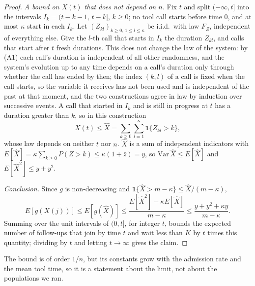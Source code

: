 \begin{proof}
\emph{A bound on $X(t)$ that does not depend on $n$.} Fix $t$ and split $(-\infty,t]$ into the intervals $I_k=(t-k-1,\,t-k]$, $k\ge0$; no tool call starts before time 0, and at most $\kappa$ start in each $I_k$. Let $(Z_{kl})_{k\ge0,\,1\le l\le\kappa}$ be i.i.d.\ with law $F_Z$, independent of everything else. Give the $l$-th call that starts in $I_k$ the duration $Z_{kl}$, and calls that start after $t$ fresh durations. This does not change the law of the system: by (A1) each call's duration is independent of all other randomness, and the system's evolution up to any time depends on a call's duration only through whether the call has ended by then; the index $(k,l)$ of a call is fixed when the call starts, so the variable it receives has not been used and is independent of the past at that moment, and the two constructions agree in law by induction over successive events. A call that started in $I_k$ and is still in progress at $t$ has a duration greater than $k$, so in this construction
\[
X(t)\le\hat X=\sum_{k\ge0}\sum_{l=1}^{\kappa}\mathbf 1\{Z_{kl}>k\},
\]
whose law depends on neither $t$ nor $n$. $\hat X$ is a sum of independent indicators with $E[\hat X]=\kappa\sum_{k\ge0}P(Z>k)\le\kappa(1+\bar z)=y$, so $\mathrm{Var}\,\hat X\le E[\hat X]$ and $E[\hat X^2]\le y+y^2$.

\emph{Conclusion.} Since $g$ is non-decreasing and $\mathbf 1\{\hat X>m-\kappa\}\le\hat X/(m-\kappa)$,
\[
E[g(X(j))]\le E[g(\hat X)]\le\frac{E[\hat X^2]+\kappa E[\hat X]}{m-\kappa}\le\frac{y+y^2+\kappa y}{m-\kappa}.
\]
Summing over the unit intervals of $(0,t]$, for integer $t$, bounds the expected number of follow-ups that join by time $t$ and wait less than $K$ by $t$ times this quantity; dividing by $t$ and letting $t\to\infty$ gives the claim.
\end{proof}

\noindent The bound is of order $1/n$, but its constants grow with the admission rate and the mean tool time, so it is a statement about the limit, not about the populations we ran.

